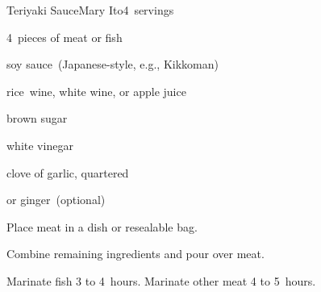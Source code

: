 \begin{recipe}{Teriyaki Sauce}{Mary Ito}{4~servings}

\begin{ingredients}
\item 4~pieces of meat or fish
\item \C{\half} soy sauce~(Japanese-style, e.g., Kikkoman)
\item \C{\third} rice~wine, white wine, or apple juice
\item \C{\quarter} brown sugar
\item {} white vinegar
\item clove of garlic, quartered
\item {} or \tp{\half} ginger~(optional)
\end{ingredients}

\begin{directions}
\item Place meat in a dish or resealable bag.
\item Combine remaining ingredients and pour over meat.
\item Marinate fish 3 to 4~hours. Marinate other meat 4 to 5~hours.
\end{directions}

\end{recipe}

